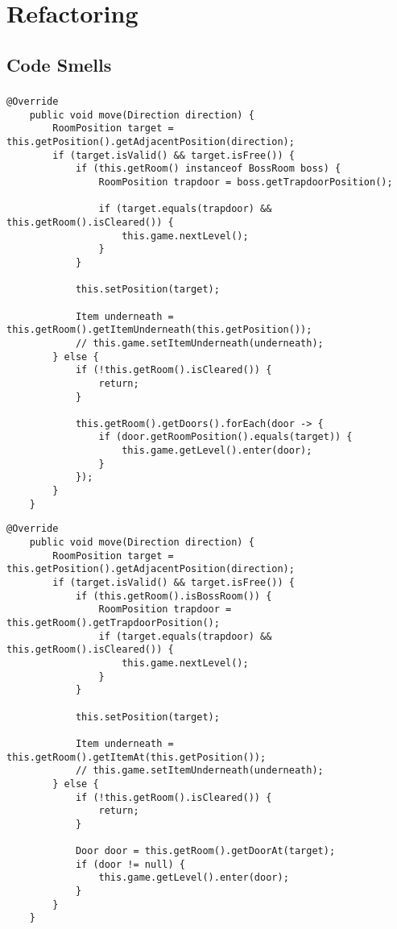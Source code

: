 \chapter{Refactoring}

\section{Code Smells}

\subsection*{}
\vspace{0.5cm}
\begin{lstlisting}[caption={Code Smell I (Vorher)}]
    @Override
    public void move(Direction direction) {
        RoomPosition target = this.getPosition().getAdjacentPosition(direction);
        if (target.isValid() && target.isFree()) {
            if (this.getRoom() instanceof BossRoom boss) {
                RoomPosition trapdoor = boss.getTrapdoorPosition();
                
                if (target.equals(trapdoor) && this.getRoom().isCleared()) {
                    this.game.nextLevel();
                }
            }
            
            this.setPosition(target);
            
            Item underneath = this.getRoom().getItemUnderneath(this.getPosition());
            // this.game.setItemUnderneath(underneath);
        } else {
            if (!this.getRoom().isCleared()) {
                return;
            }
            
            this.getRoom().getDoors().forEach(door -> {
                if (door.getRoomPosition().equals(target)) {
                    this.game.getLevel().enter(door);
                }
            });
        }
    }
\end{lstlisting}

\vspace{0.5cm}
\begin{lstlisting}[caption={Code Smell I (Nachher)}]
    @Override
    public void move(Direction direction) {
        RoomPosition target = this.getPosition().getAdjacentPosition(direction);
        if (target.isValid() && target.isFree()) {
            if (this.getRoom().isBossRoom()) {
                RoomPosition trapdoor = this.getRoom().getTrapdoorPosition();
                if (target.equals(trapdoor) && this.getRoom().isCleared()) {
                    this.game.nextLevel();
                }
            }
            
            this.setPosition(target);
            
            Item underneath = this.getRoom().getItemAt(this.getPosition());
            // this.game.setItemUnderneath(underneath);
        } else {
            if (!this.getRoom().isCleared()) {
                return;
            }
            
            Door door = this.getRoom().getDoorAt(target);
            if (door != null) {
                this.game.getLevel().enter(door);
            }
        }
    }
\end{lstlisting}


